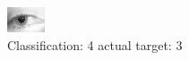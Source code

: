 \begin{figure}[h!]
\begin{center}
\includegraphics[width=0.60\columnwidth]{figures/ID1330_class_4_target_3.png}
\end{center}
\caption{ Classification: 4 actual target: 3}
\label{fig:ID1330_class_4_target_3}
\end{figure}
